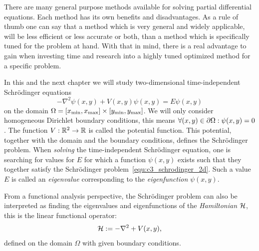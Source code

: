 


\label{cha:c3}

There are many general purpose methods available for solving partial differential equations. Each method has its own benefits and disadvantages. As a rule of thumb one can say that a method which is very general and widely applicable, will be less efficient or less accurate or both, than a method which is specifically tuned for the problem at hand. With that in mind, there is a real advantage to gain when investing time and research into a highly tuned optimized method for a specific problem.

In this and the next chapter we will study two-dimensional time-independent Schrödinger equations
\begin{equation}\label{equ:c3_schrodinger_2d}
  -\nabla^2\psi(x, y) + V(x, y) \psi(x, y) = E \psi(x, y)
\end{equation}
on the domain $\Omega = [{x_{\text{min}}}, {x_{\text{max}}}]\times[{y_{\text{min}}}, {y_{\text{max}}}]$. We will only consider homogeneous Dirichlet boundary conditions, this means $\forall (x, y) \in \partial\Omega : \psi(x, y) = 0$. The function $V: \mathbb{R}^2 \to \mathbb{R}$ is called the potential function. This potential, together with the domain and the boundary conditions, defines the Schrödinger problem. When \emph{solving} the time-independent Schrödinger equation, one is searching for values for $E$ for which a function $\psi(x, y)$  exists such that they together satisfy the Schrödinger problem~\eqref{equ:c3_schrodinger_2d}. Such a value $E$ is called an \emph{eigenvalue} corresponding to the \emph{eigenfunction} $\psi(x, y)$.

From a functional analysis perspective, the Schrödinger problem can also be interpreted as finding the eigenvalues and eigenfunctions of the \emph{Hamiltonian} $\mathcal{H}$, this is the linear functional operator:
$$
  \mathcal{H} := -\nabla^2 + V(x, y)\text{,}
$$
defined on the domain $\Omega$ with given boundary conditions.

